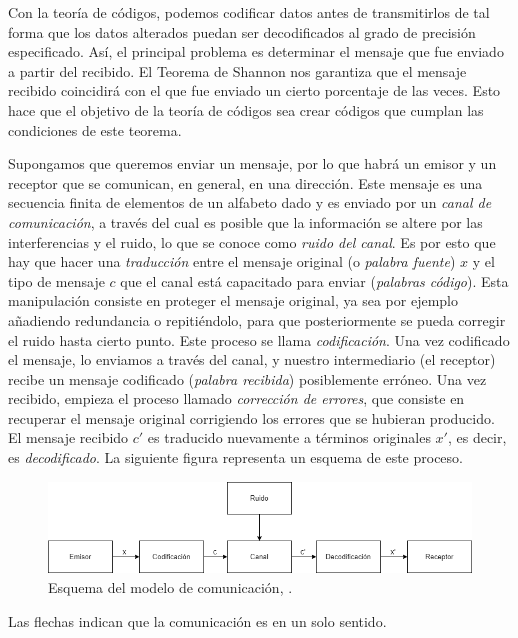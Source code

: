 Con la teoría de códigos, podemos codificar datos antes de transmitirlos de tal forma que los datos alterados puedan ser decodificados al grado de precisión especificado. Así, el principal problema es determinar el mensaje que fue enviado a partir del recibido. El Teorema de Shannon nos garantiza que el mensaje recibido coincidirá con el que fue enviado un cierto porcentaje de las veces. Esto hace que el objetivo de la teoría de códigos sea crear códigos que cumplan las condiciones de este teorema.

Supongamos que queremos enviar un mensaje, por lo que habrá un emisor y un receptor que se comunican, en general, en una dirección. Este mensaje es una secuencia finita de elementos de un alfabeto dado y es enviado por un \emph{canal de comunicación}, a través del cual es posible que la información se altere por las interferencias y el ruido, lo que se conoce como \emph{ruido del canal}. Es por esto que hay que hacer una \emph{traducción} entre el mensaje original (o \emph{palabra fuente}) $x$ y el tipo de mensaje $c$ que el canal está capacitado para enviar (\emph{palabras código}). Esta manipulación consiste en proteger el mensaje original, ya sea por ejemplo añadiendo redundancia o repitiéndolo, para que posteriormente se pueda corregir el ruido hasta cierto punto. Este proceso se llama \emph{codificación}. Una vez codificado el mensaje, lo enviamos a través del canal, y nuestro intermediario (el receptor) recibe un mensaje codificado (\emph{palabra recibida}) posiblemente erróneo. Una vez recibido, empieza el proceso llamado \emph{corrección de errores}, que consiste en recuperar el mensaje original corrigiendo los errores que se hubieran producido. El mensaje recibido $c'$ es traducido nuevamente a términos originales $x'$, es decir, es \emph{decodificado}. La siguiente figura representa un esquema de este proceso.

\begin{figure}[H]
	\center
	\includegraphics[scale=0.5]{figures/Diagrama_comunicacion.png}
	\caption{Esquema del modelo de comunicación, \cite{Podesta_2006}.}
\end{figure}

Las flechas indican que la comunicación es en un solo sentido.

